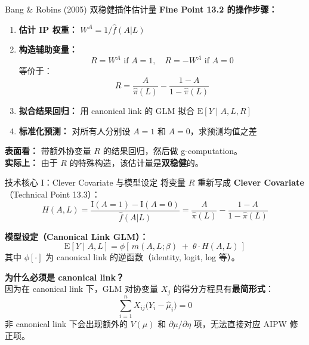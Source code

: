 \documentclass[aspectratio=169,10pt]{beamer}
\newcommand{\E}{\mathrm{E}}
\begin{document}
	\begin{frame}{Bang \& Robins (2005) 双稳健插件估计量}
		\textbf{Fine Point 13.2 的操作步骤：}
		
		\begin{enumerate}
			\item \textbf{估计 IP 权重：} $W^A = 1/\widehat{f}(A|L)$
			\item \textbf{构造辅助变量：}
			\[
			R = W^A \text{ if } A=1, \quad R = -W^A \text{ if } A=0
			\]
			等价于：
			\[
			R = \frac{A}{\widehat{\pi}(L)} - \frac{1-A}{1-\widehat{\pi}(L)}
			\]
			\item \textbf{拟合结果回归：} 用 canonical link 的 GLM 拟合 $\E[Y\mid A, L, R]$
			\item \textbf{标准化预测：} 对所有人分别设 $A=1$ 和 $A=0$，求预测均值之差
		\end{enumerate}
		
		\textbf{表面看：} 带额外协变量 $R$ 的结果回归，然后做 g-computation。\\
		\textbf{实际上：} 由于 $R$ 的特殊构造，该估计量是\textbf{双稳健}的。
	\end{frame}
	
	\begin{frame}{技术核心 I：Clever Covariate 与模型设定}
		将变量 $R$ 重新写成 \textbf{Clever Covariate}（Technical Point 13.3）：
		\[
		H(A,L) = \frac{\mathrm{I}(A=1) - \mathrm{I}(A=0)}{\widehat{f}(A|L)} = \frac{A}{\widehat{\pi}(L)} - \frac{1-A}{1-\widehat{\pi}(L)}
		\]
		
		\textbf{模型设定（Canonical Link GLM）：}
		\[
		\E[Y\mid A,L] = \phi\!\left[\, m(A,L;\beta) \;+\; \theta \cdot H(A,L) \,\right]
		\]
		其中 $\phi[\cdot]$ 为 canonical link 的逆函数（identity, logit, log 等）。
		
		\vspace{0.3cm}
		\textbf{为什么必须是 canonical link？}\\
		因为在 canonical link 下，GLM 对协变量 $X_j$ 的得分方程具有\textbf{最简形式}：
		\[
		\sum_{i=1}^n X_{ij} \big(Y_i - \widehat{\mu}_i\big) = 0
		\]
		非 canonical link 下会出现额外的 $V(\mu)$ 和 $\partial\mu/\partial\eta$ 项，无法直接对应 AIPW 修正项。
	\end{frame}
	
\end{document}
